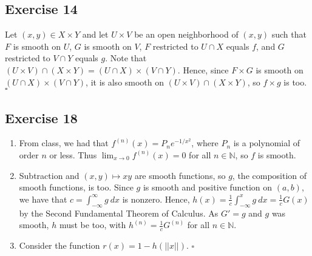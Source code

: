 \documentclass{article}
\newcommand{\N}{\mathbb{N}}
\begin{document}
\subsection*{Exercise 14}
  Let $(x,y)\in X\times Y$ and let $U\times V$ be an open neighborhood of
  $(x,y)$ such that $F$ is smooth on $U$, $G$ is smooth on $V$, $F$ restricted
  to $U\cap X$ equals $f$, and $G$ restricted to $V\cap Y$ equals $g$. Note that
  $(U\times V)\cap(X\times Y)=(U\cap X)\times(V\cap Y)$. Hence, since $F\times
  G$ is smooth on $(U\cap X)\times(V\cap Y)$, it is also smooth on $(U\times V)
  \cap(X\times Y)$, so $f\times g$ is too.
  \hfill $\square$

\subsection*{Exercise 18}
  \begin{enumerate}[label=\textbf{\alph*}]
    \item{
      From class, we had that $f^{(n)}(x)=P_ne^{-1/{x^2}}$, where $P_n$ is a
      polynomial of order $n$ or less. Thus $\lim_{x\to0}f^{(n)}(x)=0$ for all
      $n\in\N$, so $f$ is smooth.
    }
    \item{
      Subtraction and $(x,y)\mapsto xy$ are smooth functions, so $g$, the
      composition of smooth functions, is too. Since $g$ is smooth and positive
      function on $(a,b)$, we have that $c=\int_{-\infty}^{\infty}g\ dx$ is
      nonzero. Hence, $h(x)=\frac{1}{c}\int_{-\infty}^{x}g\ dx=\frac{1}{c}G(x)$
      by the Second Fundamental Theorem of Calculus. As $G'=g$ and $g$ was
      smooth, $h$ must be too, with $h^{(n)}=\frac{1}{c}G^{(n)}$ for all
      $n\in\N$.
    }
    \item{
      Consider the function $r(x)=1-h(\vert\vert x\vert\vert)$.
    }
    \hfill $\square$
  \end{enumerate}
\end{document}
